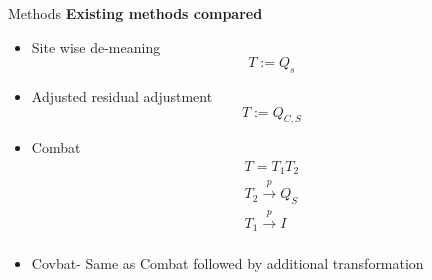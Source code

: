 \documentclass[final]{beamer}
\newlength{\onecolwid}
\begin{document}
\begin{frame}[t]
\begin{columns}[t]
\begin{column}{\onecolwid}
\begin{block}{Methods}
\textbf{Existing methods compared}
\begin{itemize}
    \item Site wise de-meaning
	$$ T := Q_s $$
    \item Adjusted residual adjustment 
    	$$ T := Q_{C,S} $$
    \item Combat 
	\begin{align*}
		T = T_1T_2 \\
		T_2 \stackrel{p}{\to} Q_S \\
		T_1 \stackrel{p}{\to} I \\
	\end{align*}
    \item Covbat- Same as Combat followed by additional transformation
\end{itemize}



\end{block}


\end{column}
\end{columns}
\end{frame}
\end{document}
